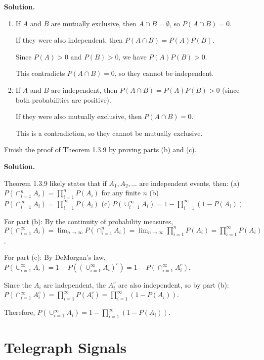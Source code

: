 \noindent\textbf{Solution.}
\begin{enumerate}[label=(\alph*)]
    \item If $A$ and $B$ are mutually exclusive, then $A \cap B = \emptyset$, so $P(A \cap B) = 0$.
    
    If they were also independent, then $P(A \cap B) = P(A)P(B)$.
    
    Since $P(A) > 0$ and $P(B) > 0$, we have $P(A)P(B) > 0$.
    
    This contradicts $P(A \cap B) = 0$, so they cannot be independent.
    
    \item If $A$ and $B$ are independent, then $P(A \cap B) = P(A)P(B) > 0$ (since both probabilities are positive).
    
    If they were also mutually exclusive, then $P(A \cap B) = 0$.
    
    This is a contradiction, so they cannot be mutually exclusive.
\end{enumerate}


\begin{problembox}
Finish the proof of Theorem 1.3.9 by proving parts (b) and (c).
\end{problembox}

\noindent\textbf{Solution.}

Theorem 1.3.9 likely states that if $A_1, A_2, \ldots$ are independent events, then:
(a) $P(\cap_{i=1}^{n} A_i) = \prod_{i=1}^{n} P(A_i)$ for any finite $n$
(b) $P(\cap_{i=1}^{\infty} A_i) = \prod_{i=1}^{\infty} P(A_i)$
(c) $P(\cup_{i=1}^{\infty} A_i) = 1 - \prod_{i=1}^{\infty} (1 - P(A_i))$

For part (b): By the continuity of probability measures, $P(\cap_{i=1}^{\infty} A_i) = \lim_{n \to \infty} P(\cap_{i=1}^{n} A_i) = \lim_{n \to \infty} \prod_{i=1}^{n} P(A_i) = \prod_{i=1}^{\infty} P(A_i)$.

For part (c): By DeMorgan's law, $P(\cup_{i=1}^{\infty} A_i) = 1 - P((\cup_{i=1}^{\infty} A_i)^c) = 1 - P(\cap_{i=1}^{\infty} A_i^c)$.

Since the $A_i$ are independent, the $A_i^c$ are also independent, so by part (b):
$P(\cap_{i=1}^{\infty} A_i^c) = \prod_{i=1}^{\infty} P(A_i^c) = \prod_{i=1}^{\infty} (1 - P(A_i))$.

Therefore, $P(\cup_{i=1}^{\infty} A_i) = 1 - \prod_{i=1}^{\infty} (1 - P(A_i))$.


\section{Telegraph Signals}

